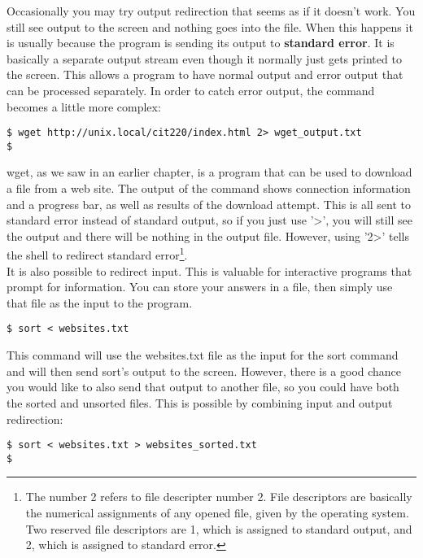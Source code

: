 Occasionally you may try output redirection that seems as if it doesn't work.  You still see output to the screen and nothing goes into the file.  When this happens it is usually because the program is sending its output to \textbf{standard error}.  It is basically a separate output stream even though it normally just gets printed to the screen. This allows a program to have normal output and error output that can be processed separately.  In order to catch error output, the command becomes a little more complex: 

\begin{verbatim}
$ wget http://unix.local/cit220/index.html 2> wget_output.txt
$
\end{verbatim}

wget, as we saw in an earlier chapter, is a program that can be used to download a file from a web site.  The output of the command shows connection information and a progress bar, as well as results of the download attempt.  This is all sent to standard error instead of standard output, so if you just use '\textgreater', you will still see the output and there will be nothing in the output file.  However, using '2\textgreater' tells the shell to redirect standard error\footnote{The number 2 refers to file descripter number 2.  File descriptors are basically the numerical assignments of any opened file, given by the operating system.  Two reserved file descriptors are 1, which is assigned to standard output, and 2, which is assigned to standard error.}.\\

It is also possible to redirect input.  This is valuable for interactive programs that prompt for information.  You can store your answers in a file, then simply use that file as the input to the program.

\begin{verbatim}
$ sort < websites.txt
\end{verbatim}

This command will use the websites.txt file as the input for the sort command and will then send sort's output to the screen.  However, there is a good chance you would like to also send that output to another file, so you could have both the sorted and unsorted files.  This is possible by combining input and output redirection:

\begin{verbatim}
$ sort < websites.txt > websites_sorted.txt
$
\end{verbatim}

